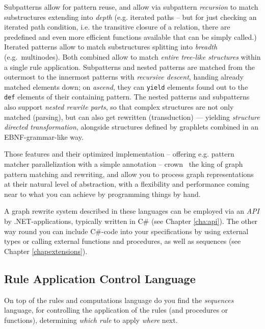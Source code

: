 Subpatterns allow for pattern reuse, and allow via subpattern \emph{recursion} to match substructures extending into \emph{depth} (e.g. iterated paths -- but for just checking an iterated path condition, i.e. the transitive closure of a relation, there are predefined and even more efficient functions available that can be simply called.)
Iterated patterns allow to match substructures splitting into \emph{breadth} (e.g.\ multinodes).
Both combined allow to match \emph{entire tree-like structures} within a single rule application. 
Subpatterns and nested patterns are matched from the outermost to the innermost patterns with \emph{recursive descent}, handing already matched elements down; on \emph{ascend}, they can \texttt{yield} elements found out to the \texttt{def} elements of their containing pattern.
The nested patterns and subpatterns also support \emph{nested rewrite parts}, so that complex structures are not only matched (parsing), but can also get rewritten (transduction) --- yielding \emph{structure directed transformation}, alongside structures defined by graphlets combined in an EBNF-grammar-like way\cite{EBNFAGTIVE}.

Those features and their optimized implementation -- offering e.g. pattern matcher parallelization with a simple annotation -- crown \GrG\ the king of graph pattern matching and rewriting, and allow you to process graph representations at their natural level of abstraction, with a flexibility and performance coming near to what you can achieve by programming things by hand.

A graph rewrite system described in these languages can be employed via an \emph{API} by .NET-applications, typically written in C\# (see Chapter \ref{cha:api}).
The other way round you can include C\#-code into your specifications by using external types or calling external functions and procedures, as well as sequences (see Chapter \ref{chapextensions}).

\subsection{Rule Application Control Language}
On top of the rules and computations language do you find the \emph{sequences} language, for controlling the application of the rules (and procedures or functions), determining \emph{which rule} to apply \emph{where} next. 

